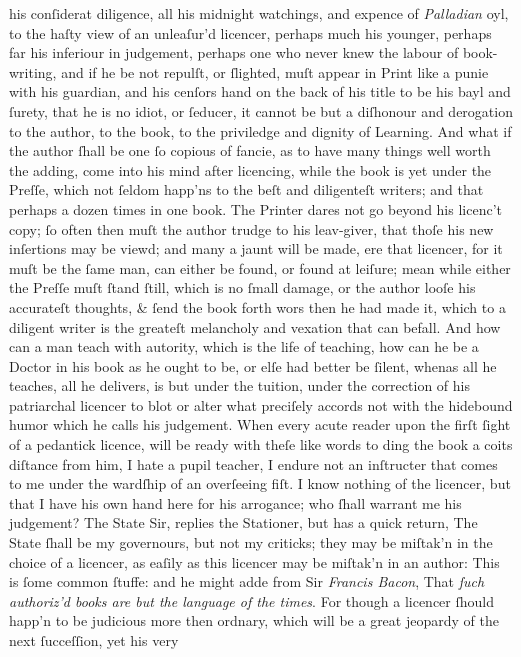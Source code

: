 his conſiderat diligence, all his midnight watchings, and expence of
\textit{Palladian} oyl, to the haſty view of an unleaſur'd licencer, perhaps
much his younger, perhaps far his inferiour in judgement, perhaps one who never
knew the labour of book-writing, and if he be not repulſt, or ſlighted, muſt
appear in Print like a punie with his guardian, and his cenſors hand on the back
of his title to be his bayl and ſurety, that he is no idiot, or ſeducer, it
cannot be but a diſhonour and derogation to the author, to the book, to the
priviledge and dignity of Learning.  And what if the author ſhall be one ſo
copious of fancie, as to have many things well worth the adding, come into his
mind after licencing, while the book is yet under the Preſſe, which not ſeldom
happ'ns to the beſt and diligenteſt writers; and that perhaps a dozen times in
one book.  The Printer dares not go beyond his licenc't copy; ſo often then muſt
the author trudge to his leav-giver, that thoſe his new inſertions may be viewd;
and many a jaunt will be made, ere that licencer, for it muſt be the ſame man,
can either be found, or found at leiſure; mean while either the Preſſe muſt
ſtand ſtill, which is no ſmall damage, or the author looſe his accurateſt
thoughts, \& ſend the book forth wors then he had made it, which to a diligent
writer is the greateſt melancholy and vexation that can befall.  And how can a
man teach with autority, which is the life of teaching, how can he be a Doctor
in his book as he ought to be, or elſe had better be ſilent, whenas all he
teaches, all he delivers, is but under the tuition, under the correction of his
patriarchal licencer to blot or alter what preciſely accords not with the
hidebound humor which he calls his judgement.  When every acute reader upon the
firſt ſight of a pedantick licence, will be ready with theſe like words to ding
the book a coits diſtance from him, I hate a pupil teacher, I endure not an
inſtructer that comes to me under the wardſhip of an overſeeing fiſt.  I know
nothing of the licencer, but that I have his own hand here for his arrogance;
who ſhall warrant me his judgement?  The State Sir, replies the Stationer, but
has a quick return, The State ſhall be my governours, but not my criticks; they
may be miſtak'n in the choice of a licencer, as eaſily as this licencer may be
miſtak'n in an author: This is ſome common ſtuffe: and he might adde from Sir
\textit{Francis Bacon}, That \textit{ſuch authoriz'd books are but the language
of the times}.  For though a licencer ſhould happ'n to be judicious more then
ordnary, which will be a great jeopardy of the next ſucceſſion, yet his very
